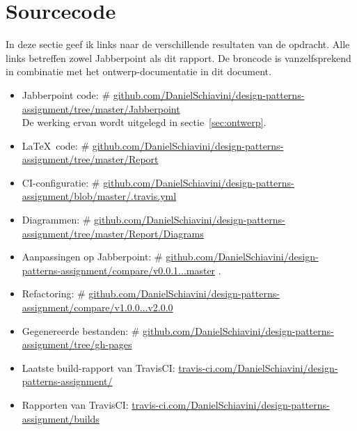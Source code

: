 \documentclass[a4paper]{article}
\makeatletter
\newcommand*{\repo}{\begingroup\@makeother\#\@repo}
\newcommand*{\@repo}[2]{%
  \href{https://github.com/DanielSchiavini/design-patterns-assignment/#1}{#2}%
  \endgroup}
\newcommand{\repolink}[1]{\repo{#1}{github.com\-/Daniel\-Schiavini\-/de\-sign-\-pat\-terns-\-as\-sign\-ment\-/#1}}
\newcommand{\cilink}[1]{\href{https://travis-ci.com/DanielSchiavini/design-patterns-assignment/#1}{travis-ci.com/DanielSchiavini/design-patterns-assignment/#1}}
\makeatother
\begin{document}
\section{Sourcecode}\label{sec:source}
	In deze sectie geef ik links naar de verschillende resultaten van de opdracht.
	Alle links betreffen zowel Jabberpoint als dit rapport.
	De broncode is vanzelfsprekend in combinatie met het ontwerp-documentatie in dit document.
	\begin{itemize}
		\item Jabberpoint code:
			\repolink{tree/master/Jabberpoint}\\
			De werking ervan wordt uitgelegd in sectie~\ref{sec:ontwerp}.
		\item \LaTeX ~code:
			\repo{tree/master/Report}{github.com/DanielSchiavini/design-patterns-assignment\-/tree\-/master\-/Report}
		\item CI-configuratie:
			\repolink{blob/master/.travis.yml}
		\item Diagrammen:
			\repo{tree/master/Report/Diagrams}{github.com/DanielSchiavini/design-patterns-assignment\-/tree\-/master\-/Report\-/Diagrams}
		\item Aanpassingen op Jabberpoint:
			\repolink{compare/v0.0.1...master}.
		\item Refactoring:
			\repo{compare/v1.0.0...v2.0.0}{github.com/DanielSchiavini/design-patterns-assignment\-/com\-pare\-/v1.0.0...v2.0.0}
		\item Gegenereerde bestanden:
			\repolink{tree/gh-pages}
		\item Laatste build-rapport van TravisCI:
			\cilink{}
		\item Rapporten van TravisCI:
			\cilink{builds}
	\end{itemize}
\end{document}
